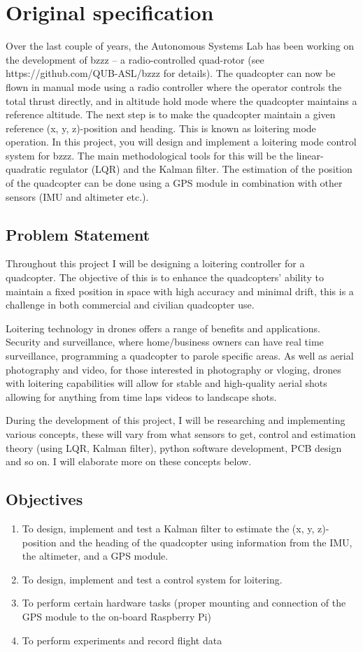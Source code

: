 \documentclass{report}
\begin{document}
\section*{Original specification}
Over the last couple of years, the Autonomous Systems Lab has been working on
the development of bzzz – a radio-controlled quad-rotor (see
https://github.com/QUB-ASL/bzzz for details). The quadcopter can now be flown in
manual mode using a radio controller where the operator controls the total
thrust directly, and in altitude hold mode where the quadcopter maintains a
reference altitude. The next step is to make the quadcopter maintain a given
reference (x, y, z)-position and heading. This is known as loitering mode
operation. In this project, you will design and implement a loitering mode
control system for bzzz. The main methodological tools for this will be the
linear-quadratic regulator (LQR) and the Kalman filter. The estimation of the
position of the quadcopter can be done using a GPS module in combination with
other sensors (IMU and altimeter etc.).
\subsection*{Problem Statement}
Throughout this project I will be designing a loitering controller for a
quadcopter. The objective of this is to enhance the quadcopters' ability to
maintain a fixed position in space with high accuracy and minimal drift, this is
a challenge in both commercial and civilian quadcopter use.

Loitering technology in drones offers a range of benefits and applications.
Security and surveillance, where home/business owners can have real time
surveillance, programming a quadcopter to parole specific areas. As well as
aerial photography and video, for those interested in photography or vloging,
drones with loitering capabilities will allow for stable and high-quality aerial
shots allowing for anything from time laps videos to landscape shots.

During the development of this project, I will be researching and implementing
various concepts, these will vary from what sensors to get, control and
estimation theory (using LQR, Kalman filter), python software development, PCB
design and so on. I will elaborate more on these concepts below.

\newpage
\subsection*{Objectives}
\begin{enumerate}
    \item To design, implement and test a Kalman filter to estimate the (x, y,
    z)-	position and the heading of the quadcopter using information from the
    IMU, the altimeter, and a GPS module.
    \item To design, implement and test a control system for loitering.
    \item To perform certain hardware tasks (proper mounting and connection of
    the GPS module to the on-board Raspberry Pi)
    \item To perform experiments and record flight data
\end{enumerate}
\end{document}
